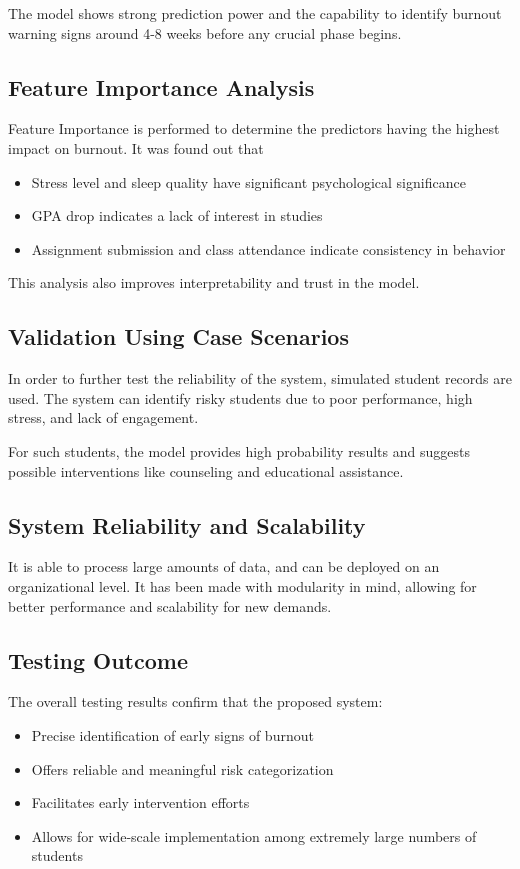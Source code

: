 The model shows strong prediction power and the capability to identify burnout warning signs around 4-8 weeks before any crucial phase begins.

\subsection{Feature Importance Analysis}

Feature Importance is performed to determine the predictors having the highest impact on burnout. It was found out that

\begin{itemize}
    \item Stress level and sleep quality have significant psychological significance
    \item GPA drop indicates a lack of interest in studies
    \item Assignment submission and class attendance indicate consistency in behavior
\end{itemize}

This analysis also improves interpretability and trust in the model.

\subsection{Validation Using Case Scenarios}

In order to further test the reliability of the system, simulated student records are used. The system can identify risky students due to poor performance, high stress, and lack of engagement.

For such students, the model provides high probability results and suggests possible interventions like counseling and educational assistance.

\subsection{System Reliability and Scalability}

It is able to process large amounts of data, and can be deployed on an organizational level. It has been made with modularity in mind, allowing for better performance and scalability for new demands.

\subsection{Testing Outcome}

The overall testing results confirm that the proposed system:

\begin{itemize}
    \item Precise identification of early signs of burnout 
    \item Offers reliable and meaningful risk categorization 
    \item Facilitates early intervention efforts
    \item Allows for wide-scale implementation among extremely large numbers of students
\end{itemize}